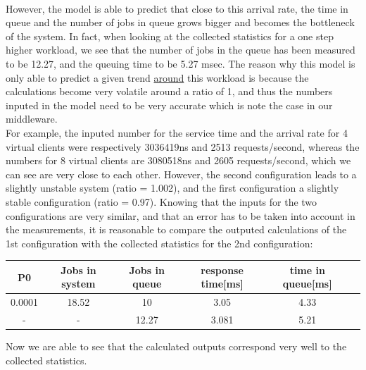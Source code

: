 \documentclass[11pt,a4paper]{article}
\begin{document}
\\However, the model is able to predict that close to this arrival rate, the time in queue and the number of jobs in queue grows bigger and becomes the bottleneck of the system. In fact, when looking at the collected statistics for a one step higher workload, we see that the number of jobs in the queue has been measured to be 12.27, and the queuing time to be 5.27 msec. The reason why this model is only able to predict a given trend \underline{around} this workload is because the calculations become very volatile around a ratio of 1, and thus the numbers inputed in the model need to be very accurate which is note the case in our middleware. 
\\
For example, the inputed number for the service time and the arrival rate for 4 virtual clients were respectively 3036419ns and 2513 requests/second, whereas the numbers for 8 virtual clients are 3080518ns and 2605 requests/second, which we can see are very close to each other. However, the second configuration leads to a slightly unstable system (ratio = 1.002), and the first configuration a slightly stable configuration (ratio = 0.97). Knowing that the inputs for the two configurations are very similar, and that an error has to be taken into account in the measurements, it is reasonable to compare the outputed calculations of the 1st configuration with the collected statistics for the 2nd configuration:
 \begin{center}

		\begin{tabular}{|c|c|c|c|c|c|}
			  \hline
			  \textbf{P0} & \textbf{Jobs in system} & \textbf{Jobs in queue} & \textbf{response time[ms]} & \textbf{time in queue[ms]}\\
			  \hline
			  0.0001  & 18.52 & 10 & 3.05 & 4.33 \\
			  - & - & 12.27  & 3.081 & 5.21 \\
			  \hline
		\end{tabular}
 \end{center}
Now we are able to see that the calculated outputs correspond very well to the collected statistics.
\\\\
\end{document}
